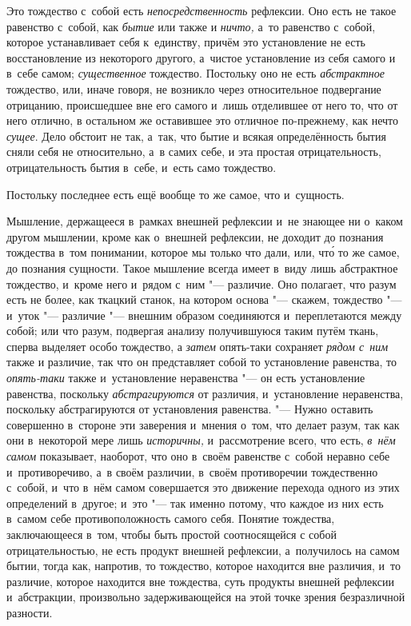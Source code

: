 Это тождество с~собой есть {\em непосредственность}
рефлексии. Оно есть не такое равенство с~собой, как
{\em бытие} или также и
{\em ничто,} а~то равенство с~собой, которое
устанавливает себя к~единству, причём это установление не есть
восстановление из некоторого другого, а~чистое установление из себя самого
и в~себе самом; {\em существенное} тождество. Постольку
оно не есть {\em абстрактное} тождество, или, иначе
говоря, не возникло через относительное подвергание отрицанию, происшедшее
вне его самого и~лишь отделившее от него то, что от него отлично, в
остальном же оставившее это отличное по-прежнему, как нечто
{\em сущее}. Дело обстоит не так, а~так, что бытие и
всякая определённость бытия сняли себя не относительно, а~в самих себе, и
эта простая отрицательность, отрицательность бытия в~себе, и~есть само
тождество.

Постольку последнее есть ещё вообще то же самое, что и~сущность.


Мышление, держащееся в~рамках внешней рефлексии и~не знающее ни о~каком
другом мышлении, кроме как о~внешней рефлексии, не доходит до познания
тождества в~том понимании, которое мы только что дали, или, чт\'{о} то же
самое, до познания сущности. Такое мышление всегда имеет в~виду лишь
абстрактное тождество, и~кроме него и~рядом с~ним "--- различие. Оно полагает,
что разум есть не более, как ткацкий станок, на котором основа "--- скажем,
тождество "--- и~уток "--- различие "--- внешним образом соединяются и~переплетаются
между собой; или что разум, подвергая анализу получившуюся таким путём
ткань, сперва выделяет особо тождество, а {\em затем}
опять-таки сохраняет {\em рядом с~ним} также и
различие, так что он представляет собой то установление равенства, то
{\em опять-таки} также и~установление неравенства "--- он
есть установление равенства, поскольку
{\em абстрагируются} от различия, и~установление
неравенства, поскольку абстрагируются от установления равенства. "--- Нужно
оставить совершенно в~стороне эти заверения и~мнения о~том, что делает
разум, так как они в~некоторой мере лишь
{\em историчны,} и~рассмотрение всего, что есть,
{\em в~нём самом} показывает, наоборот, что оно в~своём
равенстве с~собой неравно себе и~противоречиво, а~в своём различии, в~своём
противоречии тождественно с~собой, и~что в~нём самом совершается это
движение перехода одного из этих определений в~другое; и~это "--- так именно
потому, что каждое из них есть в~самом себе противоположность самого себя.
Понятие тождества, заключающееся в~том, чтобы быть простой соотносящейся с
собой отрицательностью, не есть продукт внешней рефлексии, а~получилось на
самом бытии, тогда как, напротив, то тождество, которое находится вне
различия, и~то различие, которое находится вне тождества, суть продукты
внешней рефлексии и~абстракции, произвольно задерживающейся на этой точке
зрения безразличной разности.

